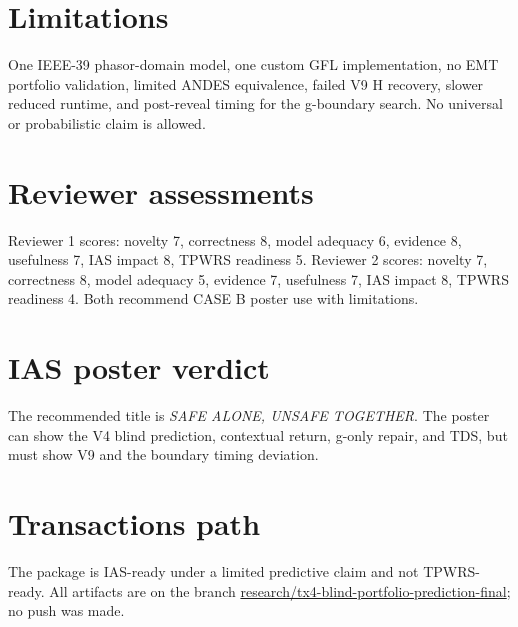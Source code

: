 \documentclass[10pt]{article}
\begin{document}
\section{Limitations}
One IEEE-39 phasor-domain model, one custom GFL implementation, no EMT
portfolio validation, limited ANDES equivalence, failed V9 H recovery,
slower reduced runtime, and post-reveal timing for the g-boundary search.
No universal or probabilistic claim is allowed.

\section{Reviewer assessments}
Reviewer 1 scores: novelty 7, correctness 8, model adequacy 6, evidence 8,
usefulness 7, IAS impact 8, TPWRS readiness 5. Reviewer 2 scores: novelty 7,
correctness 8, model adequacy 5, evidence 7, usefulness 7, IAS impact 8,
TPWRS readiness 4. Both recommend CASE B poster use with limitations.

\section{IAS poster verdict}
The recommended title is \emph{SAFE ALONE, UNSAFE TOGETHER}. The poster can
show the V4 blind prediction, contextual return, g-only repair, and TDS, but
must show V9 and the boundary timing deviation.

\section{Transactions path}
The package is IAS-ready under a limited predictive claim and not TPWRS-ready.
All artifacts are on the branch
\url{research/tx4-blind-portfolio-prediction-final}; no push was made.
\end{document}
